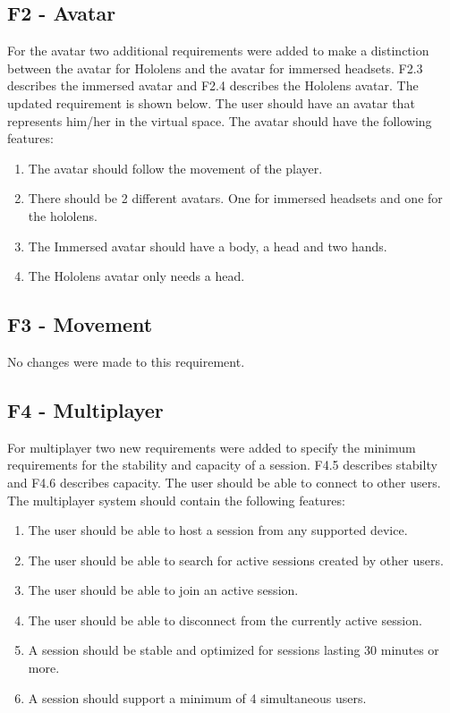         \subsection{F2 - Avatar}
        For the avatar two additional requirements were added to make a distinction between the avatar for Hololens and the avatar for immersed headsets. F2.3 describes the immersed avatar and F2.4 describes the Hololens avatar. The updated requirement is shown below.
        \newline\newline
        The user should have an avatar that represents him/her in the virtual space. The avatar should have the following features:
        \begin{enumerate}
            \item The avatar should follow the movement of the player.
            \item There should be 2 different avatars. One for immersed headsets and one for the hololens.
            \item The Immersed avatar should have a body, a head and two hands.
            \item The Hololens avatar only needs a head.
        \end{enumerate}
        
        \subsection{F3 - Movement}
        No changes were made to this requirement.
        
        \subsection{F4 - Multiplayer}
        For multiplayer two new requirements were added to specify the minimum requirements for the stability and capacity of a session. F4.5 describes stabilty and F4.6 describes capacity.
        \newline\newline
        The user should be able to connect to other users. The multiplayer system should contain the following features:
        \begin{enumerate}
            \item The user should be able to host a session from any supported device.
            \item The user should be able to search for active sessions created by other users.
            \item The user should be able to join an active session.
            \item The user should be able to disconnect from the currently active session.
            \item A session should be stable and optimized for sessions lasting 30 minutes or more.
            \item A session should support a minimum of 4 simultaneous users.
        \end{enumerate}
        
